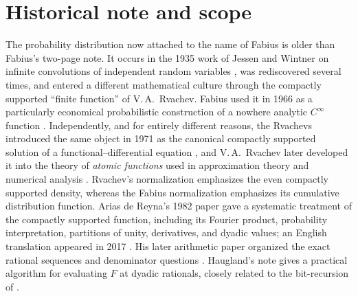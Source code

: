 \documentclass[11pt,oneside]{article}
\theoremstyle{definition}
\theoremstyle{remark}
\newcommand{\repo}{\nolinkurl{Analysis/FabiusFunction}}
\begin{document}
\begin{abstract}
The presentation follows the theorem structure of the Lean formalization under
\repo, while translating the machine-oriented decomposition into conventional mathematical
arguments.  Source-level endpoint and normalization defects are corrected rather than
repeated.  In particular, a centered finite-spline approximation is given with an explicit
uniform error, and this approximation is turned into a primitive-recursive dyadic algorithm
proving computability of the bounded Fabius function in the sense of Grzegorczyk.  Binary
reduction also yields an absolutely convergent signed-global series; finite half-base
$q$-binomial identities give arbitrary-complex translated presentations of its summands,
and a bounded-variation Toeplitz argument proves the corresponding discrete-limit formula.
\end{abstract}

\tableofcontents
\newpage


\section{Historical note and scope}
\label{sec:history}

The probability distribution now attached to the name of Fabius is older than Fabius's
two-page note.  It occurs in the 1935 work of Jessen and Wintner on infinite convolutions
of independent random variables \cite{jessen1935}, was
rediscovered several times, and entered a different mathematical culture through the
compactly supported ``finite function'' of V.\,A.~Rvachev.  Fabius used it in 1966 as a
particularly economical probabilistic construction of a nowhere analytic
$C^\infty$ function \cite{fabius1966}.  Independently, and for entirely different reasons,
the Rvachevs introduced the same object in 1971 as the canonical compactly supported
solution of a functional--differential equation \cite{rvachev1971}, and V.\,A.~Rvachev
later developed it into the theory of \emph{atomic functions} used in approximation
theory and numerical analysis \cite{rvachev1973,rvachev1979,rvachev1990}.  Rvachev's
normalization emphasizes the even compactly
supported density, whereas the Fabius normalization emphasizes its cumulative distribution
function.  Arias de Reyna's 1982 paper gave a systematic treatment of the compactly supported
function, including its Fourier product, probability interpretation, partitions of unity,
derivatives, and dyadic values; an English translation appeared in 2017
\cite{arias1982}.  His later arithmetic paper organized the exact rational sequences and
denominator questions \cite{arias2018}.  Haugland's note \cite{haugland2016} gives a
practical algorithm for evaluating $F$ at dyadic rationals, closely related to the
bit-recursion of .
\end{document}
